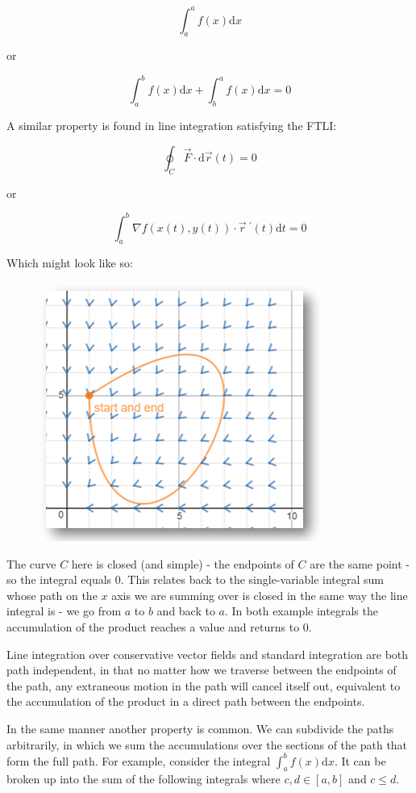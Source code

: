 \documentclass[11pt]{article}
\newcommand{\dr}{\vec{r}~^{\prime}(t)}
\begin{document}
$$\int_a^a f(x)\mathrm{d}x$$
\begin{center}
or
\end{center}
$$\int_a^b f(x)\mathrm{d}x + \int_b^a f(x)\mathrm{d}x = 0$$

A similar property is found in line integration satisfying the FTLI:

$$\oint_C \vec{F}\cdot \mathrm{d}\vec{r}(t)=0$$
\begin{center}
or
\end{center}
$$\int_a^b \nabla f(x(t),y(t))\cdot \dr\mathrm{d}t = 0$$

\newpage
Which might look like so:

\begin{figure}[h]
\centering
\includegraphics[scale=0.75]{loop}
\end{figure}

The curve $C$ here is closed (and simple) - the endpoints of $C$ are the same point - so the integral equals 0. This relates back to the single-variable integral sum whose path on the $x$ axis we are summing over is closed in the same way the line integral is - we go from $a$ to $b$ and back to $a$. In both example integrals the accumulation of the product reaches a value and returns to $0$.


Line integration over conservative vector fields and standard integration are both path independent, in that no matter how we traverse between the endpoints of the path, any extraneous motion in the path will cancel itself out, equivalent to the accumulation of the product in a direct path between the endpoints.

In the same manner another property is common. We can subdivide the paths arbitrarily, in which we sum the accumulations over the sections of the path that form the full path. For example, consider the integral $\displaystyle{\int_a^b f(x)\mathrm{d}x}$. It can be broken up into the sum of the following integrals where $c,d\in [a,b]$ and $c\leq d$.
\end{document}
